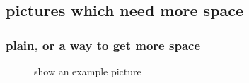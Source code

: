 \subsection{pictures which need more space} 
\begin{frame}[plain]
\frametitle{plain, or a way to get more space}
\begin{figure}
\caption{show an example picture}
\end{figure}
\end{frame}



